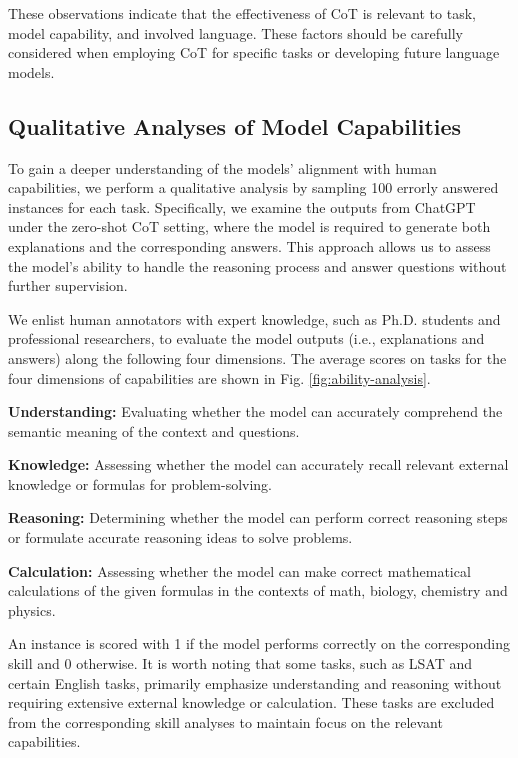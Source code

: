 These observations indicate that the effectiveness of CoT is relevant to task, model capability, and involved language. These factors should be carefully considered when employing CoT for specific tasks or developing future language models.

\subsection{Qualitative Analyses of Model Capabilities}

To gain a deeper understanding of the models' alignment with human capabilities, we perform a qualitative analysis by sampling 100 errorly answered instances for each task. Specifically, we examine the outputs from ChatGPT under the zero-shot CoT setting, where the model is required to generate both explanations and the corresponding answers. This approach allows us to assess the model's ability to handle the reasoning process and answer questions without further supervision.

We enlist human annotators with expert knowledge, such as Ph.D. students and professional researchers, to evaluate the model outputs (i.e., explanations and answers) along the following four dimensions. The average scores on tasks for the four dimensions of capabilities are shown in Fig. \ref{fig:ability-analysis}. 
\par
\textbf{Understanding:} Evaluating whether the model can accurately comprehend the semantic meaning of the context and questions.
\par
\textbf{Knowledge:} Assessing whether the model can accurately recall relevant external knowledge or formulas for problem-solving.
\par
\textbf{Reasoning:} Determining whether the model can perform correct reasoning steps or formulate accurate reasoning ideas to solve problems.
\par
\textbf{Calculation:} Assessing whether the model can make correct mathematical calculations of the given formulas in the contexts of math, biology, chemistry and physics.

An instance is scored with 1 if the model performs correctly on the corresponding skill and 0 otherwise. It is worth noting that some tasks, such as LSAT and certain English tasks, primarily emphasize understanding and reasoning without requiring extensive external knowledge or calculation. These tasks are excluded from the corresponding skill analyses to maintain focus on the relevant capabilities.

